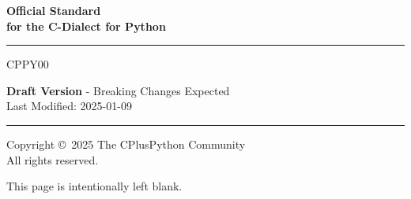 \begin{titlepage}
\begingroup
    \setlength{\parskip}{0pt}
    \vspace*{3cm}
    \begin{adjustwidth}{5cm}{0cm}

        {\selectfont \bfseries \Huge
        Official Standard \\
        for the C-Dialect for Python

        \rule{\linewidth}{1mm}

        \vspace*{1cm}

        CPPY00
        }

        \vspace*{8cm}

        {\selectfont \Large
        \textbf{Draft Version} - Breaking Changes Expected \\
        Last Modified: 2025-01-09
        }

        \vspace*{4cm}

        \rule{\linewidth}{0.5mm}

        {\selectfont \large
        Copyright \copyright \ 2025 The CPlusPython Community \\
        All rights reserved.
        
        }
    \end{adjustwidth}
\endgroup
\end{titlepage}
\newpage
\begingroup
\vspace*{\fill}
\begin{center}
    This page is intentionally left blank.
\end{center}
\vspace{\fill}
\pagestyle{empty}
\cleardoublepage
\endgroup